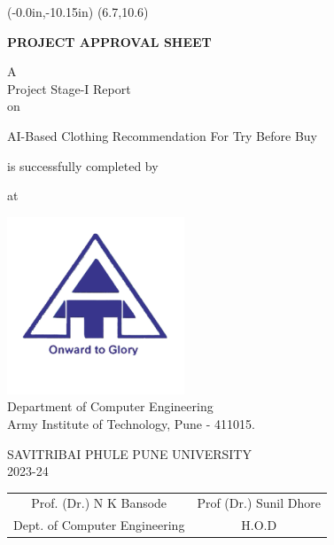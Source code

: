 \thisfancyput(-0.0in,-10.15in){
	\setlength{\unitlength}{1in}
	\framebox(6.7,10.6)
}
\setlength{\parindent}{0mm}
\begin{center}
	\vspace*{0.5 \baselineskip}

	{
		\bfseries
		PROJECT APPROVAL SHEET
		\vspace*{1.5 \baselineskip}
	}
		
	A \\ Project Stage-I Report \\ on
	\vspace*{1.5 \baselineskip}

	AI-Based Clothing Recommendation For Try Before Buy \\
	\vspace*{1.5\baselineskip}

	is successfully completed by
	
	\vspace*{\baselineskip}

	\nametable
	
	\vspace*{\baselineskip}
	
	at

	\vspace*{\baselineskip}

	\includegraphics[scale=0.75]{components/images/logo.png} \\[0.5cm]
	
	Department of Computer Engineering \\
	Army Institute of Technology, Pune - 411015.\\
	\vspace*{0.5\baselineskip}
	
	SAVITRIBAI PHULE PUNE UNIVERSITY \\
	2023-24
\end{center}

\vspace*{3\baselineskip}

\begin{table}[h!]
	\centering
	\begin{tabular}{ c c }
		Prof. (Dr.) N K Bansode \hspace{35mm} & Prof (Dr.) Sunil Dhore \\
		Dept. of Computer Engineering \hspace{35mm} & H.O.D
	\end{tabular}
\end{table}

\pagebreak